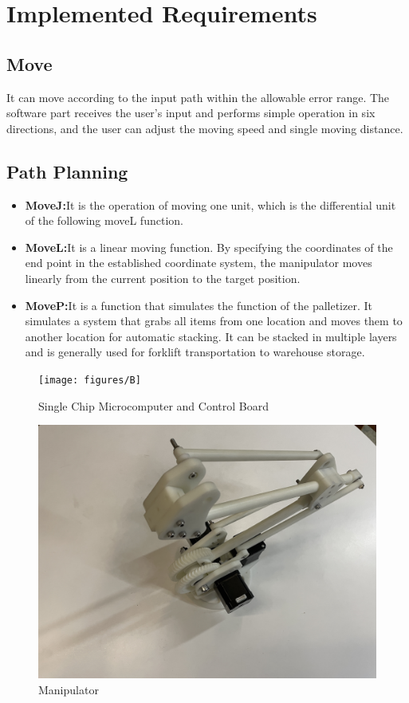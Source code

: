 \documentclass{hci}
\begin{document}
\section{Implemented Requirements}

\subsection{Move}
It can move according to the input path within the allowable error range. The software part receives the user's input and performs simple operation in six directions, and the user can adjust the moving speed and single moving distance.

\subsection{Path Planning}
\begin{itemize}
	\item \textbf{MoveJ:}It is the operation of moving one unit, which is the differential unit of the following moveL function.
	\item \textbf{MoveL:}It is a linear moving function. By specifying the coordinates of the end point in the established coordinate system, the manipulator moves linearly from the current position to the target position.
	\item \textbf{MoveP:}It is a function that simulates the function of the palletizer. It simulates a system that grabs all items from one location and moves them to another location for automatic stacking. It can be stacked in multiple layers and is generally used for forklift transportation to warehouse storage.
\end{itemize}
\begin{figure}[htbp]
	\centering
	\texttt{[image: figures/B]}
	\caption{Single Chip Microcomputer and Control Board}
	\label{fig:B}
\end{figure}
\begin{figure}[htbp]
	\centering
	\includegraphics[width=0.7\linewidth]{figures/M}
	\caption{Manipulator}
	\label{fig:M}
\end{figure}
\end{document}
